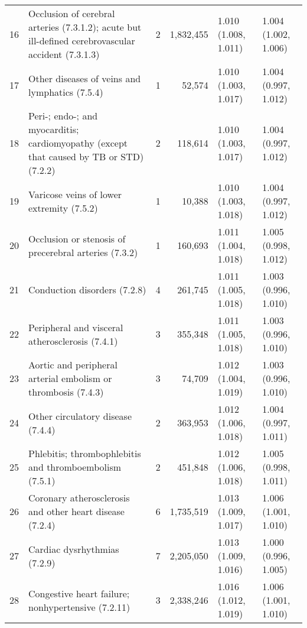\begin{tabular}{lp{6.5cm}rrp{2.2cm}p{2.2cm}}
    16 & Occlusion of cerebral arteries (7.3.1.2); acute but ill-defined cerebrovascular accident (7.3.1.3) &    2 & 1,832,455 & 1.010 (1.008, 1.011) & 1.004 (1.002, 1.006) \\ 
    17 & Other diseases of veins and lymphatics (7.5.4) &    1 & 52,574 & 1.010 (1.003, 1.017) & 1.004 (0.997, 1.012) \\ 
    18 & Peri-; endo-; and myocarditis; cardiomyopathy (except that caused by TB or STD) (7.2.2) &    2 & 118,614 & 1.010 (1.003, 1.017) & 1.004 (0.997, 1.012) \\ 
    19 & Varicose veins of lower extremity (7.5.2) &    1 & 10,388 & 1.010 (1.003, 1.018) & 1.004 (0.997, 1.012) \\ 
    20 & Occlusion or stenosis of precerebral arteries (7.3.2) &    1 & 160,693 & 1.011 (1.004, 1.018) & 1.005 (0.998, 1.012) \\ 
    21 & Conduction disorders (7.2.8) &    4 & 261,745 & 1.011 (1.005, 1.018) & 1.003 (0.996, 1.010) \\ 
    22 & Peripheral and visceral atherosclerosis (7.4.1) &    3 & 355,348 & 1.011 (1.005, 1.018) & 1.003 (0.996, 1.010) \\ 
    23 & Aortic and peripheral arterial embolism or thrombosis (7.4.3) &    3 & 74,709 & 1.012 (1.004, 1.019) & 1.003 (0.996, 1.010) \\ 
    24 & Other circulatory disease (7.4.4) &    2 & 363,953 & 1.012 (1.006, 1.018) & 1.004 (0.997, 1.011) \\ 
    25 & Phlebitis; thrombophlebitis and thromboembolism (7.5.1) &    2 & 451,848 & 1.012 (1.006, 1.018) & 1.005 (0.998, 1.011) \\ 
    26 & Coronary atherosclerosis and other heart disease (7.2.4) &    6 & 1,735,519 & 1.013 (1.009, 1.017) & 1.006 (1.001, 1.010) \\ 
    27 & Cardiac dysrhythmias (7.2.9) &    7 & 2,205,050 & 1.013 (1.009, 1.016) & 1.000 (0.996, 1.005) \\ 
    28 & Congestive heart failure; nonhypertensive (7.2.11) &    3 & 2,338,246 & 1.016 (1.012, 1.019) & 1.006 (1.001, 1.010) \\ 
   \hline
\end{tabular}

